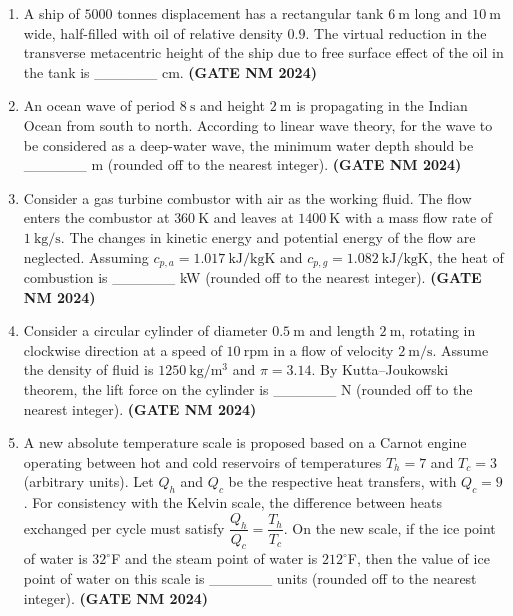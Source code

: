\documentclass[journal,15pt,onecolumn]{IEEEtran}
\theoremstyle{remark}
\begin{document}
\begin{enumerate}
\item 
A ship of $5000$ tonnes displacement has a rectangular tank $6~\mathrm{m}$ long and $10~\mathrm{m}$ wide, half-filled with oil of relative density $0.9$. The virtual reduction in the transverse metacentric height of the ship due to free surface effect of the oil in the tank is \_\_\_\_\_\_ cm.\hfill \textbf{ (GATE NM 2024)}

  \item
  An ocean wave of period $8~\mathrm{s}$ and height $2~\mathrm{m}$ is propagating in the Indian Ocean from south to north. According to linear wave theory, for the wave to be considered as a deep-water wave, the minimum water depth should be \_\_\_\_\_\_ m (rounded off to the nearest integer).\hfill \textbf{ (GATE NM 2024)}

  \item
  Consider a gas turbine combustor with air as the working fluid. The flow enters the combustor at $360~\mathrm{K}$ and leaves at $1400~\mathrm{K}$ with a mass flow rate of $1~\mathrm{kg/s}$. The changes in kinetic energy and potential energy of the flow are neglected. Assuming $c_{p,a} = 1.017~\mathrm{kJ/kgK}$ and $c_{p,g} = 1.082~\mathrm{kJ/kgK}$, the heat of combustion is \_\_\_\_\_\_ kW (rounded off to the nearest integer).\hfill \textbf{ (GATE NM 2024)}

  \item
  Consider a circular cylinder of diameter $0.5~\mathrm{m}$ and length $2~\mathrm{m}$, rotating in clockwise direction at a speed of $10~\mathrm{rpm}$ in a flow of velocity $2~\mathrm{m/s}$. Assume the density of fluid is $1250~\mathrm{kg/m^3}$ and $\pi = 3.14$. By Kutta–Joukowski theorem, the lift force on the cylinder is \_\_\_\_\_\_ N (rounded off to the nearest integer).\hfill \textbf{ (GATE NM 2024)}

  \item
  A new absolute temperature scale is proposed based on a Carnot engine operating between hot and cold reservoirs of temperatures $T_h = 7$ and $T_c = 3$ (arbitrary units). Let $Q_h$ and $Q_c$ be the respective heat transfers, with $Q_c = 9$. For consistency with the Kelvin scale, the difference between heats exchanged per cycle must satisfy $\dfrac{Q_h}{Q_c} = \dfrac{T_h}{T_c}$. On the new scale, if the ice point of water is $32^\circ$F and the steam point of water is $212^\circ$F, then the value of ice point of water on this scale is \_\_\_\_\_\_ units (rounded off to the nearest integer).\hfill \textbf{ (GATE NM 2024)}
  
\end{enumerate}
\end{document}
